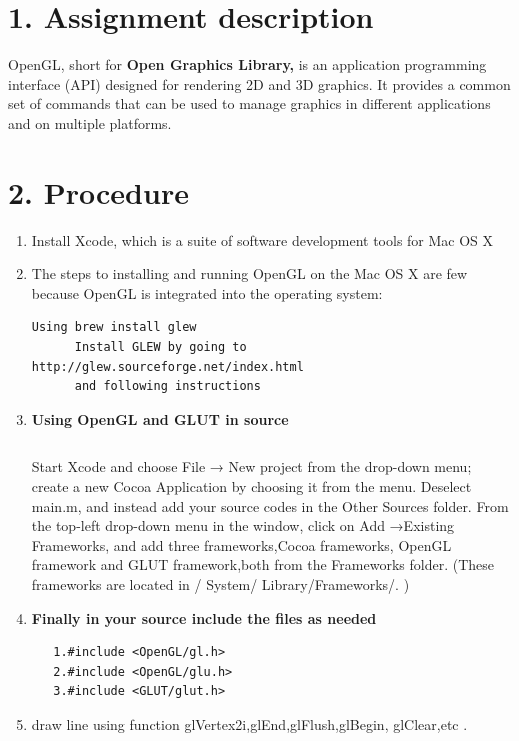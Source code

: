 \documentclass[20pt,letterpaper]{article}
\begin{document}
\section*{1. Assignment description}

  OpenGL, short for \textbf{Open Graphics Library,} is an application programming interface (API) designed for rendering 2D and 3D graphics. It provides a common set of commands that can be used to manage graphics in different applications and on multiple platforms.


\section*{2. Procedure}

\begin{enumerate}

    \item Install Xcode, which is a suite of software development tools for Mac OS X
    \item The steps to installing and running OpenGL on the Mac OS X are few because OpenGL is integrated into the operating system:
     \begin{lstlisting}[style = Python]
      Using brew install glew
      Install GLEW by going to http://glew.sourceforge.net/index.html 
      and following instructions
    \end{lstlisting}

  \item
  \textbf{Using OpenGL and GLUT in source}
  \begin{lstlisting}
  \end{lstlisting}
    Start Xcode and choose File → New project from the drop-down menu; create a new Cocoa Application by choosing it from the menu. Deselect main.m, and instead add your source codes in the Other Sources folder. From the top-left drop-down menu in the window, click on Add →Existing Frameworks, and add three frameworks,Cocoa frameworks, OpenGL framework and GLUT framework,both from the Frameworks folder. (These frameworks are located in / System/ Library/Frameworks/. )
   \item 
    \textbf{Finally in your source include the files as needed}
\begin{lstlisting}
   1.#include <OpenGL/gl.h>
   2.#include <OpenGL/glu.h>
   3.#include <GLUT/glut.h>
\end{lstlisting}
   \item
    draw line using  function glVertex2i,glEnd,glFlush,glBegin,
    glClear,etc .
\end{enumerate}
\end{document}
